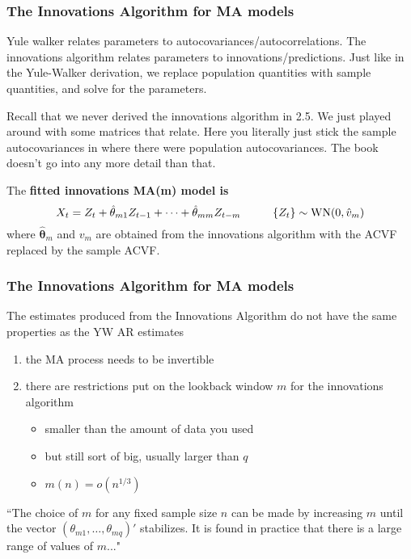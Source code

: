 \documentclass{beamer}
\begin{document}
\begin{frame}
\frametitle{The Innovations Algorithm for MA models}

Yule walker relates parameters to autocovariances/autocorrelations. The innovations algorithm relates parameters to innovations/predictions. Just like in the Yule-Walker derivation, we replace population quantities with sample quantities, and solve for the parameters.
\newline

Recall that we never derived the innovations algorithm in 2.5. We just played around with some matrices that relate. Here you literally just stick the sample autocovariances in where there were population autocovariances. The book doesn't go into any more detail than that. 
\begin{block}{The \bf{fitted innovations MA(m) model} is }
\[
X_t = Z_t + \hat{\theta}_{m1}Z_{t-1} + \cdots + \hat{\theta}_{mm}Z_{t-m} \hspace{10mm} \{Z_t\} \sim \text{WN}(0, \hat{v}_m)
\]
where $\hat{\bm{\theta}}_m$ and $v_m$ are obtained from the innovations algorithm with the ACVF replaced by the sample ACVF.
\end{block}

\end{frame}


\begin{frame}
\frametitle{The Innovations Algorithm for MA models}

The estimates produced from the Innovations Algorithm do not have the same properties as the YW AR estimates
\begin{enumerate}
\item the MA process needs to be invertible
\item there are restrictions put on the lookback window $m$ for the innovations algorithm
  \begin{itemize}
  \item smaller than the amount of data you used
  \item but still sort of big, usually larger than $q$
  \item $m(n) = o(n^{1/3})$
  \end{itemize}
\end{enumerate}

``The choice of $m$ for any fixed sample size $n$ can be made by increasing $m$ until the vector $(\theta_{m1}, \ldots, \theta_{mq})'$ stabilizes. It is found in practice that there is a large range of values of $m$..."


\end{frame}
\end{document}
